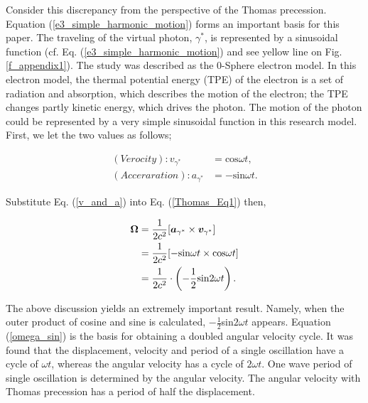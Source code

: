 \documentclass[%
 reprint,
 amsmath,amssymb,
 aps,
]{revtex4-1}
\numberwithin{equation}{section}%
\begin{document}
Consider this discrepancy from the perspective of the Thomas precession. Equation (\ref{e3_simple_harmonic_motion}) forms an important basis for this paper. The traveling of the virtual photon, ${\gamma^{*}}$, is represented by a sinusoidal function (cf. Eq. (\ref{e3_simple_harmonic_motion}) and see yellow line on Fig. \ref{f_appendix1}). The study was described as the 0-Sphere electron model. In this electron model, the thermal potential  energy (TPE) of the electron is a set of radiation and absorption, which describes the motion of the electron; the TPE changes partly kinetic energy, which drives the photon. The motion of the photon could be represented by a very simple sinusoidal function in this research model. First, we let the two values as follows;

    \begin{equation}
        \begin{split}
            (Verocity): v_{\gamma^{*}}
                &= \mathrm{cos}\omega t , \\
            (Acceraration): a_{\gamma^{*}}
                &= - \mathrm{sin}\omega t
                .
        \label{v_and_a}
        \end{split}
    \end{equation}

Substitute Eq. (\ref{v_and_a}) into Eq. (\ref{Thomas_Eq1}) then,

    \begin{equation}
        \begin{split}
            {\bf \Omega} 
                &= \frac{1}{2 c^2}[{\boldsymbol a_{\gamma^{*}}} \times {\boldsymbol v_{\gamma^{*}}} ]  \\
                &= \frac{1}{2 c^2} [ -\mathrm{sin}\omega t \times \mathrm{cos}\omega t ] \\
                &= \frac{1}{2 c^2} \cdot \left( - \frac{1}{2} \mathrm{sin}2\omega t \right)
                .
        \label{omega_sin}
        \end{split}
    \end{equation}


The above discussion yields an extremely important result. Namely, when the outer product of cosine and sine is calculated, $-\frac{1}{2}$sin$2\omega t$ appears. Equation (\ref{omega_sin}) is the basis for obtaining a doubled angular velocity cycle. It was found that the displacement, velocity and period of a single oscillation have a cycle of $\omega t$, whereas the angular velocity has a cycle of $2\omega t$. One wave period of single oscillation is determined by the angular velocity. The angular velocity with Thomas precession has a period of half the displacement.
\end{document}
